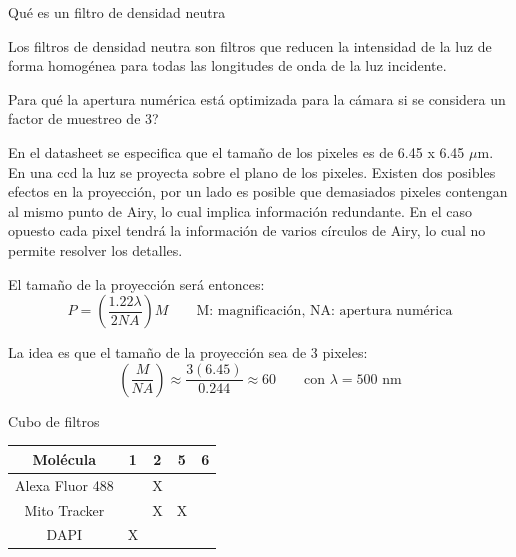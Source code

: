 \documentclass[addpoints,12pt]{exam}
\begin{document}
	\begin{questions}
		{\question Qu\'e es un filtro de densidad neutra}
		
		Los filtros de densidad neutra son filtros que reducen la intensidad de la luz de forma homog\'enea para todas las longitudes de onda de la luz incidente.
		
		{\question Para qu\'e la apertura num\'erica est\'a optimizada para la c\'amara si se considera un factor de muestreo de 3?}
		
		En el datasheet se especifica que el tama\~no de los pixeles es de 6.45 x 6.45 $\mu$m. En una ccd la luz se proyecta sobre el plano de los pixeles. Existen dos posibles efectos en la proyecci\'on, por un lado es posible que demasiados pixeles contengan al mismo punto de Airy, lo cual implica informaci\'on redundante. En el caso opuesto cada pixel tendr\'a la informaci\'on de varios c\'irculos de Airy, lo cual no permite resolver los detalles.
		
		El tama\~no de la proyecci\'on ser\'a entonces:
		\begin{equation}
			P = \left(\dfrac{1.22\lambda}{2NA}\right)M \qquad \text{M: magnificaci\'on, NA: apertura num\'erica}
		\end{equation}
		
		La idea es que el tama\~no de la proyecci\'on sea de 3 pixeles:
		\begin{equation}
			\left(\dfrac{M}{NA}\right) \approx \dfrac{3(6.45)}{0.244} \approx 60 \qquad \text{con $\lambda = 500$ nm}
		\end{equation}
		
		{\question Cubo de filtros}
		\begin{table}[h]
			\centering
			\begin{tabular}{c|cccc}
				\hline
				\textbf{Molécula} & \textbf{1} & \textbf{2} & \textbf{5} & \textbf{6} \\
				\hline
				Alexa Fluor 488 & & X & & \\
				Mito Tracker & & X & X & \\
				DAPI & X & & & \\
				\hline
			\end{tabular}
		\end{table}
	\end{questions}
\end{document}
